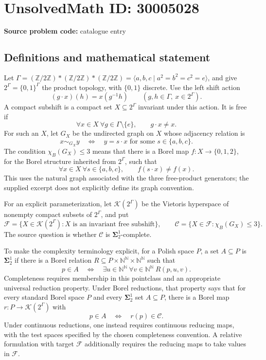 \documentclass[11pt]{article}
\newcommand{\N}{\mathbb{N}}
\newcommand{\Z}{\mathbb{Z}}
\begin{document}
\section*{UnsolvedMath ID: 30005028}
\textbf{Source problem code:} catalogue entry
\subsection{Definitions and mathematical statement}
Let \(\Gamma=(\Z/2\Z)*(\Z/2\Z)*(\Z/2\Z)=\langle a,b,c\mid a^2=b^2=c^2=e\rangle\), and give \(2^\Gamma=\{0,1\}^\Gamma\) the product topology, with \(\{0,1\}\) discrete. Use the left shift action
\[
(g\cdot x)(h)=x(g^{-1}h)\qquad(g,h\in\Gamma,\ x\in2^\Gamma).
\]
A compact subshift is a compact set \(X\subseteq2^\Gamma\) invariant under this action. It is free if
\[
\forall x\in X\ \forall g\in\Gamma\setminus\{e\},\qquad g\cdot x\ne x.
\]
For such an \(X\), let \(G_X\) be the undirected graph on \(X\) whose adjacency relation is
\[
x\sim_{G_X}y\quad\Longleftrightarrow\quad y=s\cdot x\text{ for some }s\in\{a,b,c\}.
\]
The condition \(\chi_B(G_X)\le3\) means that there is a Borel map \(f:X\to\{0,1,2\}\), for the Borel structure inherited from \(2^\Gamma\), such that
\[
\forall x\in X\ \forall s\in\{a,b,c\},\qquad f(s\cdot x)\ne f(x).
\]
This uses the natural graph associated with the three free-product generators; the supplied excerpt does not explicitly define its graph convention.

For an explicit parameterization, let \(\mathcal K(2^\Gamma)\) be the Vietoris hyperspace of nonempty compact subsets of \(2^\Gamma\), and put
\[
\mathcal F=\{X\in\mathcal K(2^\Gamma):X\text{ is an invariant free subshift}\},\qquad
\mathcal C=\{X\in\mathcal F:\chi_B(G_X)\le3\}.
\]
The source question is whether \(\mathcal C\) is \(\boldsymbol\Sigma^1_2\)-complete.

To make the complexity terminology explicit, for a Polish space \(P\), a set \(A\subseteq P\) is \(\boldsymbol\Sigma^1_2\) if there is a Borel relation \(R\subseteq P\times\N^\N\times\N^\N\) such that
\[
p\in A\quad\Longleftrightarrow\quad\exists u\in\N^\N\ \forall v\in\N^\N\ R(p,u,v).
\]
Completeness requires membership in this pointclass and an appropriate universal reduction property. Under Borel reductions, that property says that for every standard Borel space \(P\) and every \(\boldsymbol\Sigma^1_2\) set \(A\subseteq P\), there is a Borel map \(r:P\to\mathcal K(2^\Gamma)\) with
\[
p\in A\quad\Longleftrightarrow\quad r(p)\in\mathcal C.
\]
Under continuous reductions, one instead requires continuous reducing maps, with the test spaces specified by the chosen completeness convention. A relative formulation with target \(\mathcal F\) additionally requires the reducing maps to take values in \(\mathcal F\).
\end{document}
